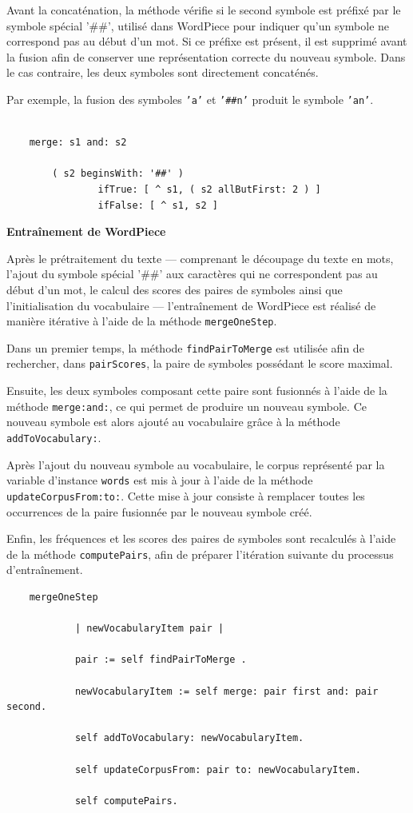 \documentclass[12pt,a4paper]{report}
\begin{document}
	Avant la concaténation, la méthode vérifie si le second symbole est préfixé par le symbole spécial '\#\#', utilisé dans WordPiece pour indiquer qu’un symbole ne correspond pas au début d’un mot. Si ce préfixe est présent, il est supprimé avant la fusion afin de conserver une représentation correcte du nouveau symbole. Dans le cas contraire, les deux symboles sont directement concaténés.
	
	Par exemple, la fusion des symboles \texttt{'a'} et \texttt{'\#\#n'} produit le symbole \texttt{'an'}.
	
	\begin{verbatim}
		
	merge: s1 and: s2
		
		( s2 beginsWith: '##' )
				ifTrue: [ ^ s1, ( s2 allButFirst: 2 ) ]
				ifFalse: [ ^ s1, s2 ]
	\end{verbatim}
	
	\textbf{Entraînement de WordPiece}
	
	Après le prétraitement du texte --- comprenant le découpage du texte en mots, l’ajout du symbole spécial '\#\#' aux caractères qui ne correspondent pas au début d’un mot, le calcul des scores des paires de symboles ainsi que l’initialisation du vocabulaire --- l’entraînement de WordPiece est réalisé de manière itérative à l’aide de la méthode \texttt{mergeOneStep}.
	
	Dans un premier temps, la méthode \texttt{findPairToMerge} est utilisée afin de rechercher, dans \texttt{pairScores}, la paire de symboles possédant le score maximal.
	
	Ensuite, les deux symboles composant cette paire sont fusionnés à l’aide de la méthode \texttt{merge:and:}, ce qui permet de produire un nouveau symbole. Ce nouveau symbole est alors ajouté au vocabulaire grâce à la méthode \texttt{addToVocabulary:}.
	
	Après l’ajout du nouveau symbole au vocabulaire, le corpus représenté par la variable d’instance \texttt{words} est mis à jour à l’aide de la méthode \texttt{updateCorpusFrom:to:}. Cette mise à jour consiste à remplacer toutes les occurrences de la paire fusionnée par le nouveau symbole créé.
	
	Enfin, les fréquences et les scores des paires de symboles sont recalculés à l’aide de la méthode \texttt{computePairs}, afin de préparer l’itération suivante du processus d’entraînement.
	
	\begin{verbatim}
	mergeOneStep
		
			| newVocabularyItem pair |
				
			pair := self findPairToMerge .
				
			newVocabularyItem := self merge: pair first and: pair second.
				
			self addToVocabulary: newVocabularyItem.
				
			self updateCorpusFrom: pair to: newVocabularyItem.
				
			self computePairs.
	\end{verbatim}
	
\end{document}
